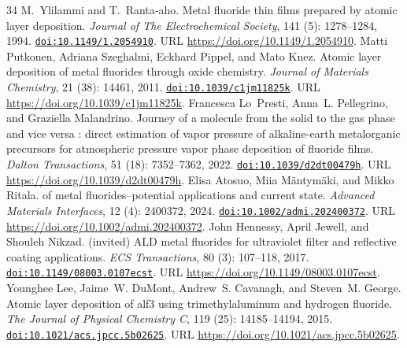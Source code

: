 \documentclass[11pt,a4paper]{article}
\theoremstyle{plain}
\theoremstyle{definition}
\theoremstyle{remark}
\providecommand{\doi}[1]{\href{https://doi.org/#1}{\texttt{doi:#1}}}
\begin{document}
\begin{thebibliography}{34}
M.~Ylilammi and T.~Ranta‐aho.
\newblock Metal fluoride thin films prepared by atomic layer deposition.
\newblock \emph{Journal of The Electrochemical Society}, 141
  (5): 1278--1284, 1994.
\newblock \doi{10.1149/1.2054910}.
\newblock URL \url{https://doi.org/10.1149/1.2054910}.
Matti Putkonen, Adriana Szeghalmi, Eckhard Pippel, and Mato Knez.
\newblock Atomic layer deposition of metal fluorides through oxide chemistry.
\newblock \emph{Journal of Materials Chemistry}, 21 (38):
  14461, 2011.
\newblock \doi{10.1039/c1jm11825k}.
\newblock URL \url{https://doi.org/10.1039/c1jm11825k}.
Francesca Lo~Presti, Anna~L. Pellegrino, and Graziella Malandrino.
\newblock Journey of a molecule from the solid to the gas phase and vice versa
  : direct estimation of vapor pressure of alkaline-earth metalorganic
  precursors for atmospheric pressure vapor phase deposition of fluoride films.
\newblock \emph{Dalton Transactions}, 51 (18): 7352--7362,
  2022.
\newblock \doi{10.1039/d2dt00479h}.
\newblock URL \url{https://doi.org/10.1039/d2dt00479h}.
Elisa Atosuo, Miia Mäntymäki, and Mikko Ritala.
 of metal fluorides–potential applications and current state.
\newblock \emph{Advanced Materials Interfaces}, 12 (4):
  2400372, 2024.
\newblock \doi{10.1002/admi.202400372}.
\newblock URL \url{https://doi.org/10.1002/admi.202400372}.
John Hennessy, April Jewell, and Shouleh Nikzad.
\newblock (invited) {ALD} metal fluorides for ultraviolet filter and reflective
  coating applications.
\newblock \emph{ECS Transactions}, 80 (3): 107--118, 2017.
\newblock \doi{10.1149/08003.0107ecst}.
\newblock URL \url{https://doi.org/10.1149/08003.0107ecst}.
Younghee Lee, Jaime~W. DuMont, Andrew~S. Cavanagh, and Steven~M. George.
\newblock Atomic layer deposition of alf3 using trimethylaluminum and hydrogen
  fluoride.
\newblock \emph{The Journal of Physical Chemistry C}, 119
  (25): 14185--14194, 2015.
\newblock \doi{10.1021/acs.jpcc.5b02625}.
\newblock URL \url{https://doi.org/10.1021/acs.jpcc.5b02625}.

\end{thebibliography}
\end{document}
